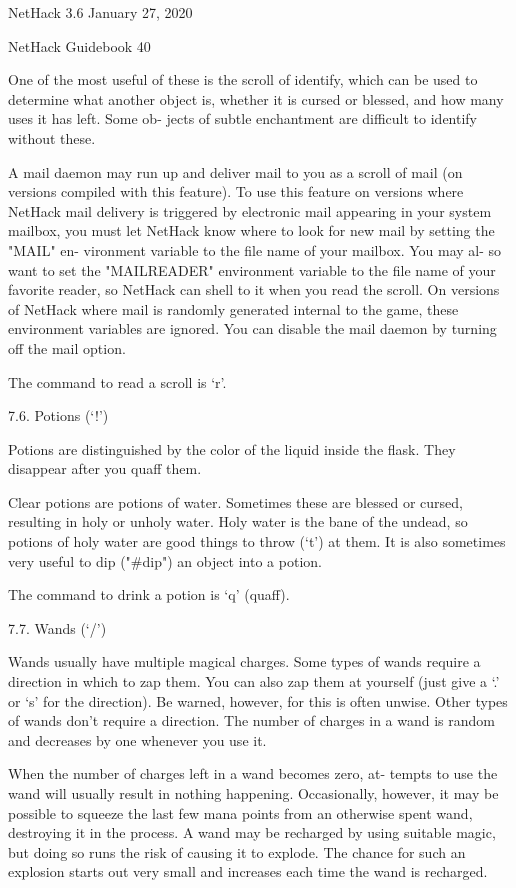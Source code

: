 \documentclass[11pt]{article}
\begin{document}
NetHack 3.6                   January 27, 2020





NetHack Guidebook                       40



   One of the most useful of these is the scroll of identify,
which can be used to determine what another object is, whether it
is cursed or blessed, and how many uses it has left.  Some ob-
jects of subtle enchantment are difficult to identify without
these.

   A mail daemon may run up and deliver mail to you as a scroll
of mail (on versions compiled with this feature). To use this
feature on versions where NetHack mail delivery is triggered by
electronic mail appearing in your system mailbox, you must let
NetHack know where to look for new mail by setting the "MAIL" en-
vironment variable to the file name of your mailbox. You may al-
so want to set the "MAILREADER" environment variable to the file
name of your favorite reader, so NetHack can shell to it when you
read the scroll. On versions of NetHack where mail is randomly
generated internal to the game, these environment variables are
ignored. You can disable the mail daemon by turning off the mail
option.

The command to read a scroll is `r'.

7.6. Potions (`!')

   Potions are distinguished by the color of the liquid inside
the flask. They disappear after you quaff them.

   Clear potions are potions of water.  Sometimes these are
blessed or cursed, resulting in holy or unholy water. Holy water
is the bane of the undead, so potions of holy water are good
things to throw (`t') at them. It is also sometimes very useful
to dip ("\#dip") an object into a potion.

The command to drink a potion is `q' (quaff).

7.7. Wands (`/')

   Wands usually have multiple magical charges. Some types of
wands require a direction in which to zap them. You can also zap
them at yourself (just give a `.' or `s' for the direction).  Be
warned, however, for this is often unwise. Other types of wands
don't require a direction. The number of charges in a wand is
random and decreases by one whenever you use it.

   When the number of charges left in a wand becomes zero, at-
tempts to use the wand will usually result in nothing happening.
Occasionally, however, it may be possible to squeeze the last few
mana points from an otherwise spent wand, destroying it in the
process.  A wand may be recharged by using suitable magic, but
doing so runs the risk of causing it to explode. The chance for
such an explosion starts out very small and increases each time
the wand is recharged.
\end{document}
